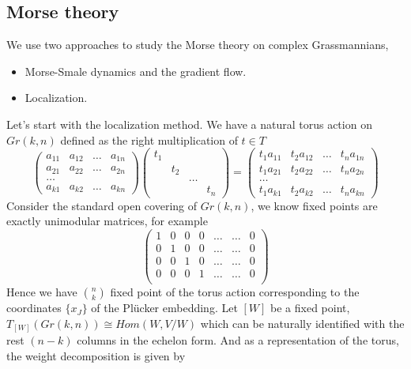 \documentclass[../main.tex]{subfiles}
\begin{document}
\subsection{Morse theory}
\begin{example}
We use two approaches to study the Morse theory on complex Grassmannians,
\begin{itemize}
\item Morse-Smale dynamics and the gradient flow.
\item Localization.
\end{itemize}
Let's start with the localization method. We have a natural torus action on $Gr(k,n)$ defined as the right multiplication of $t\in T$
$$\begin{pmatrix}a_{11} & a_{12} & \dots & a_{1n}\\
a_{21} & a_{22} & \dots & a_{2n}\\
\dots \\
a_{k1} & a_{k2} & \dots & a_{kn}\end{pmatrix}\begin{pmatrix}t_{1} \\
& t_{2}\\
&& \dots\\
&&&t_{n}\end{pmatrix}=\begin{pmatrix}t_{1}a_{11} & t_{2}a_{12} & \dots & t_{n}a_{1n}\\
t_{1}a_{21} & t_{2}a_{22} & \dots & t_{n}a_{2n}\\
\dots \\
t_{1}a_{k1} & t_{2}a_{k2} & \dots & t_{n}a_{kn}\end{pmatrix}$$
Consider the standard open covering of $Gr(k,n)$, we know fixed points are exactly unimodular matrices, for example
$$
\begin{pmatrix}1 & 0 & 0 & 0 & \dots & \dots & 0\\
0 & 1 & 0 & 0 & \dots & \dots & 0\\
0 & 0 & 1 & 0 & \dots & \dots & 0\\
0 & 0 & 0 & 1 & \dots & \dots & 0\\\end{pmatrix}
$$
Hence we have $\binom{n}{k}$ fixed point of the torus action corresponding to the coordinates $\{x_{J}\}$ of the Plücker embedding. Let $[W]$ be a fixed point, $T_{[W]}(Gr(k,n))\cong Hom(W, V/W)$ which can be naturally identified with the rest $(n-k)$ columns in the echelon form. And as a representation of the torus, the weight decomposition is given by 

\end{example}
\end{document}
